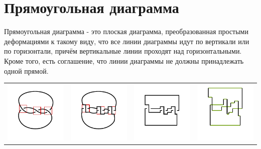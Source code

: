 \section{Прямоугольная диаграмма}
Прямоугольная диаграмма - это плоская диаграмма, преобразованная простыми деформациями к такому виду, что все линии диаграммы идут по вертикали или по горизонтали, причём вертикальные линии проходят над горизонтальными.
Кроме того, есть соглашение, что линии диаграммы не должны принадлежать одной прямой.

\begin{tabular}{
>{\centering\arraybackslash}m{3cm}
>{\centering\arraybackslash}m{3cm}
>{\centering\arraybackslash}m{3cm}
>{\centering\arraybackslash}m{3cm}
}
\includegraphics{images/sample-simple-knot-to-rect-0.pdf}
&
\includegraphics{images/sample-simple-knot-to-rect-1.pdf}
&
\includegraphics{images/sample-simple-knot-to-rect-2.pdf}
&
\includegraphics{images/sample-simple-knot-to-rect-4.pdf}

\end{tabular}
